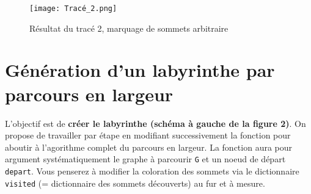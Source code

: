\begin{figure}[!h]\centering
\texttt{[image: Tracé\_2.png]}
\caption{Résultat du tracé 2, marquage de sommets arbitraire}
\end{figure}








\section{Génération d'un labyrinthe par parcours en largeur}

L'objectif est de \textbf{créer le labyrinthe (schéma à gauche de la figure 2)}.
On propose de travailler par étape en modifiant successivement la fonction pour aboutir à l'agorithme complet du parcours en largeur.
La fonction aura pour argument systématiquement le graphe à parcourir \texttt{G} et un noeud de départ \texttt{depart}. Vous penserez à modifier la coloration des sommets via le dictionnaire \texttt{visited} (= dictionnaire des sommets découverts) au fur et à mesure.

